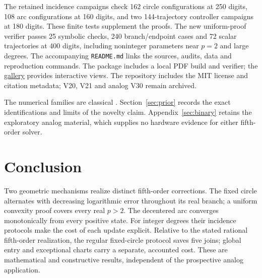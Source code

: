 \documentclass[11pt,a4paper]{article}
\begin{document}
The retained incidence campaigns check 162 circle configurations at 250 digits, 108 arc configurations at 160 digits, and two 144-trajectory controller campaigns at 180 digits. These finite tests supplement the proofs. The new uniform-proof verifier passes 25 symbolic checks, 240 branch/endpoint cases and 72 scalar trajectories at 400 digits, including noninteger parameters near $p=2$ and large degrees. The accompanying \texttt{README.md} links the sources, audits, data and reproduction commands. The package includes a local PDF build and verifier; the \href{https://ivan-fr.github.io/pandrosion/}{gallery} provides interactive views. The repository includes the MIT license and citation metadata; V20, V21 and analog V30 remain archived.

The numerical families are classical \cite{dlmf38,laszkiewicz2009,baker1996}. Section~\ref{sec:prior} records the exact identifications and limits of the novelty claim. Appendix~\ref{sec:binary} retains the exploratory analog material, which supplies no hardware evidence for either fifth-order solver.

\section{Conclusion}
Two geometric mechanisms realize distinct fifth-order corrections. The fixed circle alternates with decreasing logarithmic error throughout its real branch; a uniform convexity proof covers every real $p>2$. The decentered arc converges monotonically from every positive state. For integer degrees their incidence protocols make the cost of each update explicit. Relative to the stated rational fifth-order realization, the regular fixed-circle protocol saves five joins; global entry and exceptional charts carry a separate, accounted cost. These are mathematical and constructive results, independent of the prospective analog application.

\clearpage
\appendix
\end{document}
